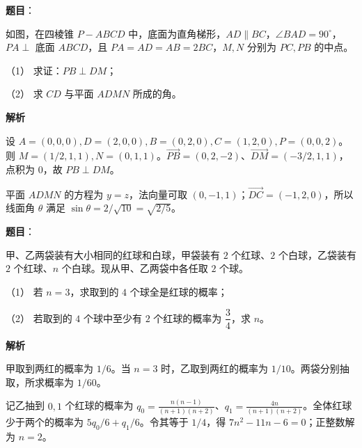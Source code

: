 \begin{answer}

\textbf{题目}：

如图，在四棱锥 $P-ABCD$ 中，底面为直角梯形，$AD\parallel BC$，$\angle BAD=90^\circ$，$PA\perp$ 底面 $ABCD$，且 $PA=AD=AB=2BC$，$M,N$ 分别为 $PC,PB$ 的中点。

（1） 求证：$PB\perp DM$；

（2） 求 $CD$ 与平面 $ADMN$ 所成的角。
\nopagebreak[4]
\begin{center}\end{center}
\nopagebreak[4]
\textbf{解析}


设 $A=(0,0,0),D=(2,0,0),B=(0,2,0),C=(1,2,0),P=(0,0,2)$。则 $M=(1/2,1,1),N=(0,1,1)$。$\overrightarrow{PB}=(0,2,-2)$、$\overrightarrow{DM}=(-3/2,1,1)$，点积为 $0$，故 $PB\perp DM$。


平面 $ADMN$ 的方程为 $y=z$，法向量可取 $(0,-1,1)$；$\overrightarrow{DC}=(-1,2,0)$，所以线面角 $\theta$ 满足 $\sin\theta=2/\sqrt{10}=\sqrt{2/5}$。



\end{answer}
\begin{answer}

\textbf{题目}：

甲、乙两袋装有大小相同的红球和白球，甲袋装有 $2$ 个红球、$2$ 个白球，乙袋装有 $2$ 个红球、$n$ 个白球。现从甲、乙两袋中各任取 $2$ 个球。

（1） 若 $n=3$，求取到的 $4$ 个球全是红球的概率；

（2） 若取到的 $4$ 个球中至少有 $2$ 个红球的概率为 $\dfrac34$，求 $n$。

\textbf{解析}


甲取到两红的概率为 $1/6$。当 $n=3$ 时，乙取到两红的概率为 $1/10$。两袋分别抽取，所求概率为 $1/60$。


记乙抽到 $0,1$ 个红球的概率为 $q_0=\frac{n(n-1)}{(n+1)(n+2)}$、$q_1=\frac{4n}{(n+1)(n+2)}$。全体红球少于两个的概率为 $5q_0/6+q_1/6$。令其等于 $1/4$，得 $7n^2-11n-6=0$；正整数解为 $n=2$。



\end{answer}
